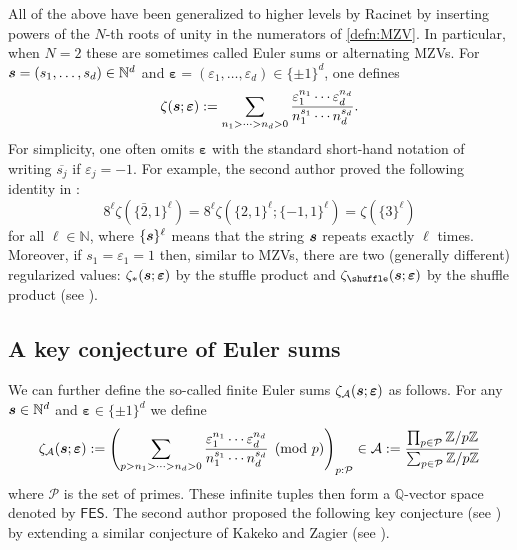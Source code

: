 \documentclass{article}
\newcommand{\FES}{\mathsf {FES}}
\newcommand{\sha}{\shuffle}
\newcommand\eps{{\varepsilon}}
\newcommand{\bfs}{{\boldsymbol{\sl{s}}}}
\newcommand\bfeps{{\boldsymbol \varepsilon}}
\newcommand{\calA}{\mathcal{A}}
\newcommand{\calP}{\mathcal{P}}
\newcommand{\N}{\mathbb{N}}
\newcommand{\Z}{\mathbb{Z}}
\newcommand{\Q}{\mathbb{Q}}
\newcommand{\ol}{\overline}
\theoremstyle{plain}
\theoremstyle{definition}
\begin{document}
All of the above have been generalized to higher levels by Racinet \cite{Racinet2002} by inserting powers of the $N$-th roots of unity in the numerators of \eqref{defn:MZV}.
In particular, when $N=2$ these are sometimes called Euler sums or alternating MZVs. For $\bfs=(s_1,\dots,s_d)\in\N^d$ and
$\bfeps=(\eps_{1}, \dots,\eps_d)\in\{\pm 1\}^d$, one defines
\begin{equation}\label{defn:ES}
\zeta(\bfs;\bfeps):=\sum_{n_1>\dots>n_d>0}  \frac{\eps_1^{n_1}\cdots \eps_d^{n_d}}{n_1^{s_1}\cdots n_d^{s_d}}.
\end{equation}
For simplicity, one often omits $\bfeps$ with the standard short-hand notation of writing $\ol{s_j}$ if $\eps_j=-1$. For example,
the second author proved the following identity in \cite{Zhao2010a}:
\begin{equation}\label{equ:2bar1}
  8^\ell   \zeta(\{\bar2,1\}^\ell)= 8^\ell  \zeta(\{2,1\}^\ell;\{-1,1\}^\ell)=\zeta(\{3\}^\ell)
\end{equation}
for all $\ell\in\N$, where $\{\bfs\}^\ell$ means that the string $\bfs$ repeats exactly $\ell$ times. Moreover, if $s_1=\eps_1=1$
then, similar to MZVs, there are two (generally different) regularized values: $\zeta_\ast(\bfs;\bfeps)$ by the stuffle product and $\zeta_\sha(\bfs;\bfeps)$ by the shuffle product (see \cite[\S 13.3]{Zhao2016}).


\subsection{A key conjecture of Euler sums}
We can further define the so-called finite Euler sums $\zeta_\calA(\bfs;\bfeps)$ as follows. For any $\bfs\in\N^d$ and $\bfeps\in\{\pm 1\}^d$ we define
\begin{equation*}
\zeta_\calA(\bfs;\bfeps):=\left( \sum_{p>n_1>\dots>n_d>0}  \frac{\eps_1^{n_1}\cdots \eps_d^{n_d}}{n_1^{s_1}\cdots n_d^{s_d}} \pmod{p}\right)_{p: \calP}\in \calA:=\frac{\prod_{p\in\calP} \Z/p\Z }{\sum_{p\in\calP} \Z/p\Z}
\end{equation*}
where $\calP$ is the set of primes. These infinite tuples then form a $\Q$-vector space denoted by $\FES$. The second author proposed the following key conjecture
(see \cite[Conjecture~8.6.9]{Zhao2016}) by extending a similar conjecture of Kakeko and Zagier (see \cite[Main Conjecture]{KanekoZa2013}).
\end{document}
